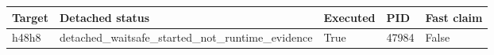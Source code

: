 {\small
\begin{tabular}{lllll}
\hline
Target & Detached status & Executed & PID & Fast claim \\
\hline
h48h8 & detached\_waitsafe\_started\_not\_runtime\_evidence & True & 47984 & False \\
\hline
\end{tabular}
}
